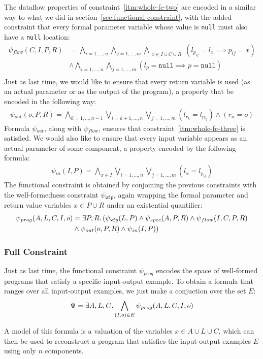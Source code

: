 The dataflow properties of constraint~\ref{itm:whole-fc-two} are encoded in a
similar way to what we did in section~\ref{sec:functional-constraint}, with the
added constraint that every formal parameter variable whose value is
\lstinline{null} must also have a \lstinline{null} location:
%
\begin{align*}
  \psi{}_{flow}(C,I,P,R)
  &=\bigwedge_{i=1,\ldots,n}
    \bigwedge_{j=1,\ldots,m}
    \bigwedge_{\substack{x \in I \cup C \cup R}}
    (l_{p_{ij}} = l_x \implies p_{ij} = x) \\
  &\wedge\bigwedge_{i=1,\ldots,n}
    \bigwedge_{j=1,\ldots,m}
    (l_p = \mathtt{null} \implies p = \mathtt{null}) \\
\end{align*}
%
\noindent
Just as last time, we would like to ensure that every return variable is used
(as an actual parameter or as the output of the program), a property that be
encoded in the following way:
%
\begin{align*}
  \psi{}_{out}(o, P, R)
  =\bigwedge_{k=1,\ldots,n-1}
    \bigvee_{i=k+1,\ldots,n}
    \bigvee_{j=1,\ldots,m}
    (l_{r_k} = l_{p_{ij}})
  \wedge (r_n = o)
\end{align*}
%
\noindent
Formula $\psi{}_{out}$, along with $\psi{}_{flow}$, ensures that
constraint~\ref{itm:whole-fc-three} is satisfied.
We would also like to ensure that every input variable appears as an actual
parameter of some component, a property encoded by the following formula:
%
\begin{align*}
  \psi{}_{in}(I, P)
  =\bigwedge_{x \in I}
    \bigvee_{i=1,\ldots,n}
    \bigvee_{j=1,\ldots,m}
    (l_{x} = l_{p_{ij}})
\end{align*}
%
The functional constraint is obtained by conjoining the previous constraints
with the well-formedness constraint $\psi{}_{\mathtt{wfp}}$,
again wrapping the formal parameter and return value variables $x \in P \cup R$
under an existential quantifier:
%
\begin{align*}
  \psi{}_{prog}(A,L,C,I,o) &= \exists P,R\ldotp
  (\psi{}_{\mathtt{wfp}}(L, P) \wedge
  \psi{}_{spec}(A, P, R) \wedge
  \psi{}_{flow}(I, C, P, R)\\&\wedge 
  \psi{}_{out}(o, P, R) \wedge
  \psi{}_{in}(I, P))
\end{align*}

\subsubsection{Full Constraint}
\label{sec:whole-full-constraint}

Just as last time, the functional constraint $\psi{}_{prog}$ encodes the space
of well-formed programs that satisfy a specific input-output example.
To obtain a formula that ranges over all input-output examples, we just make a
conjuction over the set $E$:
%
\[
  \Psi{}=\exists{A,L,C}\ldotp\bigwedge_{(I, o) \in E}\psi{}_{prog}(A,L,C,I,o)
\]

A model of this formula is a valuation of the variables $x \in A \cup L \cup C$,
which can then be used to reconstruct a program that satisfies the input-output
examples $E$ using only $n$ components.